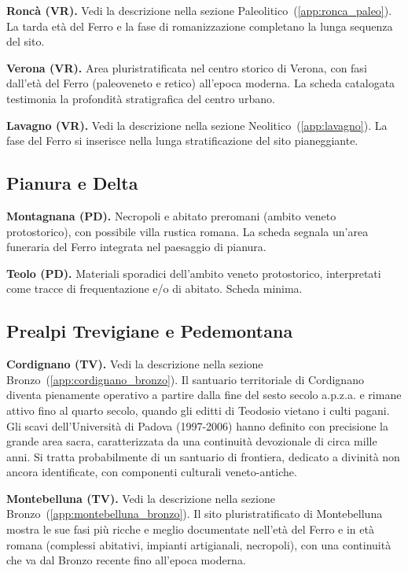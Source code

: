 \textbf{Roncà (VR).} \label{app:ronca_ferro} Vedi la descrizione nella sezione Paleolitico~(\ref{app:ronca_paleo}). La tarda età del Ferro e la fase di romanizzazione completano la lunga sequenza del sito.

\textbf{Verona (VR).} Area pluristratificata nel centro storico di Verona, con fasi dall'età del Ferro (paleoveneto e retico) all'epoca moderna. La scheda catalogata testimonia la profondità stratigrafica del centro urbano.

\textbf{Lavagno (VR).} \label{app:lavagno_ferro} Vedi la descrizione nella sezione Neolitico~(\ref{app:lavagno}). La fase del Ferro si inserisce nella lunga stratificazione del sito pianeggiante.

\subsection{Pianura e Delta}

\textbf{Montagnana (PD).} Necropoli e abitato preromani (ambito veneto protostorico), con possibile villa rustica romana. La scheda segnala un'area funeraria del Ferro integrata nel paesaggio di pianura.

\textbf{Teolo (PD).} Materiali sporadici dell'ambito veneto protostorico, interpretati come tracce di frequentazione e/o di abitato. Scheda minima.

\subsection{Prealpi Trevigiane e Pedemontana}

\textbf{Cordignano (TV).} \label{app:cordignano_ferro} Vedi la descrizione nella sezione Bronzo~(\ref{app:cordignano_bronzo}). Il santuario territoriale di Cordignano diventa pienamente operativo a partire dalla fine del sesto secolo a.p.z.a. e rimane attivo fino al quarto secolo, quando gli editti di Teodosio vietano i culti pagani. Gli scavi dell'Università di Padova (1997-2006) hanno definito con precisione la grande area sacra, caratterizzata da una continuità devozionale di circa mille anni. Si tratta probabilmente di un santuario di frontiera, dedicato a divinità non ancora identificate, con componenti culturali veneto-antiche.

\textbf{Montebelluna (TV).} \label{app:montebelluna_ferro} Vedi la descrizione nella sezione Bronzo~(\ref{app:montebelluna_bronzo}). Il sito pluristratificato di Montebelluna mostra le sue fasi più ricche e meglio documentate nell'età del Ferro e in età romana (complessi abitativi, impianti artigianali, necropoli), con una continuità che va dal Bronzo recente fino all'epoca moderna.

